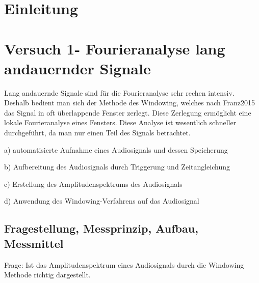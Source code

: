 \documentclass[12pt,oneside,a4paper]{report}
\begin{document}




\clearpage

%
%


%
%


%
%


%
%




\setcounter{page}{1}
%
%
\chapter{Einleitung}
\label{chap:EINL}



%
%
\chapter{Versuch 1- Fourieranalyse lang andauernder Signale}
\label{chap:VERSUCH_1}

Lang andauernde Signale sind für die Fourieranalyse sehr rechen intensiv. Deshalb bedient man sich der Methode des Windowing, welches nach Franz2015 \cite{Franz2015j} das Signal in oft überlappende Fenster zerlegt. Diese Zerlegung ermöglicht eine lokale Fourieranalyse eines Fensters. Diese Analyse ist wesentlich schneller durchgeführt, da man nur einen Teil des Signals betrachtet.

a) automatisierte Aufnahme eines Audiosignals und dessen Speicherung

b) Aufbereitung des Audiosignals durch Triggerung und Zeitangleichung

c) Erstellung des Amplitudenspektrums des Audiosignals

d) Anwendung des Windowing-Verfahrens  auf das Audiosignal


\section{Fragestellung, Messprinzip, Aufbau, Messmittel}
\label{chap:VERSUCH_1_FRAGESTELLUNG}
Frage: Ist das Amplitudenspektrum eines Audiosignals durch die Windowing Methode richtig dargestellt.
\end{document}

